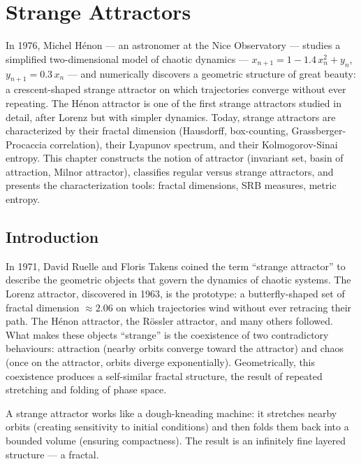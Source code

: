 \chapter{Strange Attractors}
\label{ch:attractors}

In 1976, Michel Hénon --- an astronomer at the Nice Observatory --- studies a simplified two-dimensional model of chaotic dynamics --- $x_{n+1} = 1 - 1.4\,x_n^2 + y_n$, $y_{n+1} = 0.3\,x_n$ --- and numerically discovers a geometric structure of great beauty: a crescent-shaped strange attractor on which trajectories converge without ever repeating. The Hénon attractor is one of the first strange attractors studied in detail, after Lorenz but with simpler dynamics. Today, strange attractors are characterized by their fractal dimension (Hausdorff, box-counting, Grassberger-Procaccia correlation), their Lyapunov spectrum, and their Kolmogorov-Sinai entropy. This chapter constructs the notion of attractor (invariant set, basin of attraction, Milnor attractor), classifies regular versus strange attractors, and presents the characterization tools: fractal dimensions, SRB measures, metric entropy.

\section{Introduction}

In 1971, David Ruelle and Floris Takens coined the term ``strange attractor'' to describe the geometric objects that govern the dynamics of chaotic systems. The Lorenz attractor, discovered in 1963, is the prototype: a butterfly-shaped set of fractal dimension $\approx 2.06$ on which trajectories wind without ever retracing their path. The H\'enon attractor, the R\"ossler attractor, and many others followed. What makes these objects ``strange'' is the coexistence of two contradictory behaviours: attraction (nearby orbits converge toward the attractor) and chaos (once on the attractor, orbits diverge exponentially). Geometrically, this coexistence produces a self-similar fractal structure, the result of repeated stretching and folding of phase space.

\begin{intuition}
A strange attractor works like a dough-kneading machine: it stretches nearby
orbits (creating sensitivity to initial conditions) and then folds them back
into a bounded volume (ensuring compactness). The result is an infinitely
fine layered structure --- a fractal.
\end{intuition}

